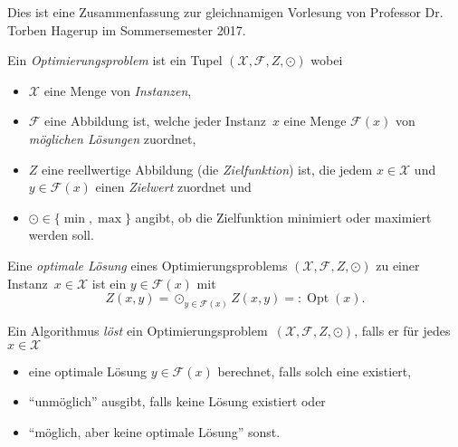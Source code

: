 \documentclass{cheat-sheet}
\newcommand{\Instances}{\mathcal{X}} %
\newcommand{\Feasible}{\mathcal{F}} %
\newcommand{\ObjFun}{Z} %
\newcommand{\Goal}{\odot} %
\newcommand{\OptTuple}{(\Instances{}, \Feasible{}, \ObjFun{}, \Goal)} %
\DeclareMathOperator{\Opt}{Opt} %
\begin{document}
\raggedcolumns %


Dies ist eine Zusammenfassung zur gleichnamigen Vorlesung von Professor Dr. Torben Hagerup im Sommersemester 2017.




\begin{defn}
  Ein \emph{Optimierungsproblem} ist ein Tupel $\OptTuple$ wobei
  \begin{itemize}
    \item $\Instances$ eine Menge von \emph{Instanzen},
    \item $\Feasible$ eine Abbildung ist, welche jeder Instanz~$x$ eine Menge $\Feasible(x)$ von \emph{möglichen Lösungen} zuordnet,
    \item $\ObjFun$ eine reellwertige Abbildung (die \emph{Zielfunktion}) ist, die jedem $x \in \Instances$ und $y \in \Feasible(x)$ einen \textit{Zielwert} zuordnet und
    \item $\Goal \in \{ \min, \max \}$ angibt, ob die Zielfunktion minimiert oder maximiert werden soll.
  \end{itemize}
\end{defn}

\begin{defn}
  Eine \emph{optimale Lösung} eines Optimierungsproblems $\OptTuple$ zu einer Instanz~$x \in \Instances$ ist ein $y \in \Feasible(x)$ mit
  \[ \ObjFun(x, y) = \Goal_{y \in \Feasible(x)} Z(x, y) =: \Opt(x). \]
\end{defn}

\begin{defn}
  Ein Algorithmus \emph{löst} ein Optimierungsproblem~$\OptTuple$, falls er für jedes $x \in \Instances$
  \begin{itemize}
    \item eine optimale Lösung $y \in \Feasible(x)$ berechnet, falls solch eine existiert,
    \item "`unmöglich"' ausgibt, falls keine Lösung existiert oder
    \item "`möglich, aber keine optimale Lösung"' sonst.
  \end{itemize}
\end{defn}
\end{document}
